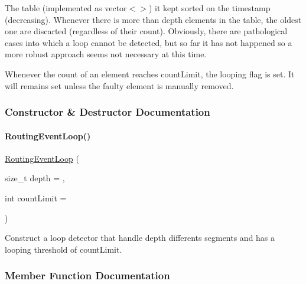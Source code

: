 The table (implemented as {\ttfamily vector$<$$>$}) it kept sorted on the timestamp (decreasing). Whenever there is more than {\ttfamily depth} elements in the table, the oldest one are discarted (regardless of their count). Obviously, there are pathological cases into which a loop cannot be detected, but so far it has not happened so a more robust approach seems not necessary at this time.

Whenever the count of an element reaches {\ttfamily count\+Limit}, the looping flag is set. It will remains set unless the faulty element is manually removed. 

\subsubsection{Constructor \& Destructor Documentation}
\mbox{\label{classKite_1_1RoutingEventLoop_aa33efa06ccc2175e35eff7ac6dadffb6}} 
\paragraph{\texorpdfstring{Routing\+Event\+Loop()}{RoutingEventLoop()}}
{\footnotesize\ttfamily \mbox{\hyperlink{classKite_1_1RoutingEventLoop}{Routing\+Event\+Loop}} (\begin{DoxyParamCaption}\item[{size\+\_\+t}]{depth = {},  }\item[{int}]{count\+Limit = {} }\end{DoxyParamCaption})}

Construct a loop detector that handle {\ttfamily depth} differents segments and has a looping threshold of {\ttfamily count\+Limit}. 

\subsubsection{Member Function Documentation}
\mbox{\label{classKite_1_1RoutingEventLoop_a78155a2b0119ac92d377fa404e348a98}} 
